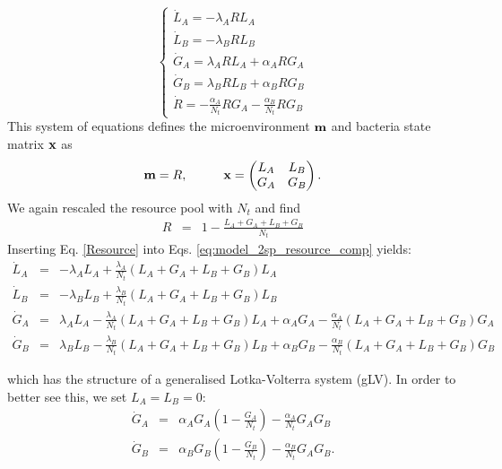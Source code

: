\documentclass[10pt,A4paper]{article}
\begin{document}
\begin{equation}
    \begin{cases}
        \dot{L}_A = - \lambda_A R L_A\\
        \dot{L}_B = - \lambda_B R L_B \\
        \dot{G}_A = \lambda_A R L_A +\alpha_A R G_A\\
        \dot{G}_B = \lambda_B R L_B +\alpha_B R G_B\\
        \dot{R} =-\frac{\alpha_A}{N_t} R G_A-\frac{\alpha_B}{N_t} R G_B
    \end{cases}
    \label{eq:model_2sp_resource_comp}
\end{equation}
This system of equations defines the microenvironment $\mathbf{m}$ and bacteria state matrix $\mathbf{x}$ as
\begin{equation}
    \mathbf{m} = R, \hspace{1cm}
    \mathbf{x} = \begin{pmatrix}
        L_A & L_B \\
        G_A & G_B 
    \end{pmatrix}.
\end{equation}
We again rescaled the resource pool with $N_t$ and find
\begin{eqnarray}
\label{Resource}
R &=&1-\frac{L_A+G_A+L_B+G_B}{N_t}
\end{eqnarray}
Inserting Eq. \ref{Resource} into Eqs. \ref{eq:model_2sp_resource_comp} yields:
\begin{eqnarray*}
\dot{L}_A &=& - \lambda_A  L_A + \frac{\lambda_A}{N_t}\left(L_A+G_A+L_B+G_B\right )L_A\\
\dot{L}_B &=& - \lambda_B L_B + \frac{\lambda_B}{N_t}\left(L_A+G_A+L_B+G_B\right )L_B \\
\dot{G}_A &=&  \lambda_A  L_A - \frac{\lambda_A}{N_t}\left(L_A+G_A+L_B+G_B\right )L_A +\alpha_A G_A - \frac{\alpha_A}{N_t}\left(L_A+G_A+L_B+G_B\right )G_A\\
\dot{G}_B &=& \lambda_B L_B - \frac{\lambda_B}{N_t}\left(L_A+G_A+L_B+G_B\right )L_B  +\alpha_B G_B -\frac{\alpha_B}{N_t}\left(L_A+G_A+L_B+G_B\right )G_B
\end{eqnarray*}

which has the structure of a generalised Lotka-Volterra system (gLV).
In order to better see this, we set $L_A=L_B=0$: 
\begin{eqnarray}
\label{eq:LV_simple1}
\dot{G}_A &=& \alpha_A G_A\left(1 - \frac{G_A}{N_t}\right ) - \frac{\alpha_A}{N_t}G_AG_B\\
\dot{G}_B &=& \alpha_B G_B\left(1-\frac{G_B}{N_t}\right ) -\frac{\alpha_B}{N_t}G_AG_B. 
\label{eq:LV_simple2}
\end{eqnarray} 
\end{document}
